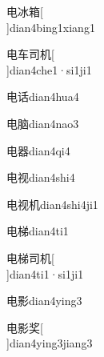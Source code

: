 \begin{verbete}[5;6;15]{电冰箱}[\\]{dian4bing1xiang1}
\end{verbete}

\begin{verbete}[5;4;5;6]{电车司机}[\\]{dian4che1·si1ji1}
\end{verbete}

\begin{verbete}[5;8]{电话}{dian4hua4}
\end{verbete}

\begin{verbete}[5;10]{电脑}{dian4nao3}
\end{verbete}

\begin{verbete}[5;16]{电器}{dian4qi4}
\end{verbete}

\begin{verbete}[5;8]{电视}{dian4shi4}
\end{verbete}

\begin{verbete}[5;8;6]{电视机}{dian4shi4ji1}
\end{verbete}

\begin{verbete}[5;11]{电梯}{dian4ti1}
\end{verbete}

\begin{verbete}[5;11;5;6]{电梯司机}[\\]{dian4ti1·si1ji1}
\end{verbete}

\begin{verbete}[5;15]{电影}{dian4ying3}
\end{verbete}

\begin{verbete}[5;15;9]{电影奖}[\\]{dian4ying3jiang3}
\end{verbete}

